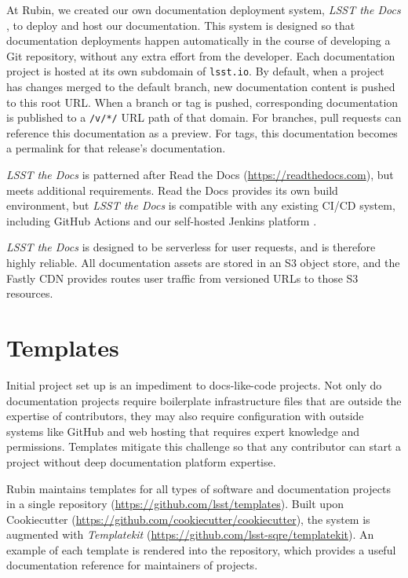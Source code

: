 \documentclass[11pt,twoside]{article}
\begin{document}
At Rubin, we created our own documentation deployment system, \textit{LSST the Docs} \citep{SQR-006}, to deploy and host our documentation.
This system is designed so that documentation deployments happen automatically in the course of developing a Git repository, without any extra effort from the developer.
Each documentation project is hosted at its own subdomain of \texttt{lsst.io}.
By default, when a project has changes merged to the default branch, new documentation content is pushed to this root URL.
When a branch or tag is pushed, corresponding documentation is published to a \texttt{/v/*/} URL path of that domain.
For branches, pull requests can reference this documentation as a preview.
For tags, this documentation becomes a permalink for that release's documentation.

\textit{LSST the Docs} is patterned after Read the Docs (\url{https://readthedocs.com}), but meets additional requirements.
Read the Docs provides its own build environment, but \textit{LSST the Docs} is compatible with any existing CI/CD system, including GitHub Actions and our self-hosted Jenkins platform \citep{2018SPIE10707E..09J}.

\textit{LSST the Docs} is designed to be serverless for user requests, and is therefore highly reliable.
All documentation assets are stored in an S3 object store, and the Fastly CDN provides routes user traffic from versioned URLs to those S3 resources.

\section{Templates}

Initial project set up is an impediment to docs-like-code projects.
Not only do documentation projects require boilerplate infrastructure files that are outside the expertise of contributors, they may also require configuration with outside systems like GitHub and web hosting that requires expert knowledge and permissions.
Templates mitigate this challenge so that any contributor can start a project without deep documentation platform expertise.

Rubin maintains templates for all types of software and documentation projects in a single repository (\url{https://github.com/lsst/templates}).
Built upon Cookiecutter (\url{https://github.com/cookiecutter/cookiecutter}), the system is augmented with \textit{Templatekit} (\url{https://github.com/lsst-sqre/templatekit}).
An example of each template is rendered into the repository, which provides a useful documentation reference for maintainers of projects.
\end{document}
